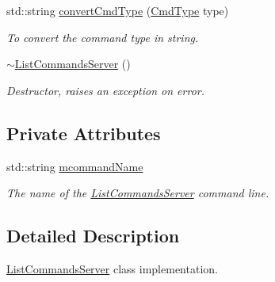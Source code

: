 \begin{DoxyCompactItemize}
std::string \hyperlink{classListCommandsServer_af253d25c235222b5872c31e590869a7a}{convertCmdType} (\hyperlink{CommandServer_8hpp_a7ae3a49efad67c34030ecbed1d947844}{CmdType} type)
\begin{DoxyCompactList}\small\item\em To convert the command type in string. \item\end{DoxyCompactList}\item 
\hypertarget{classListCommandsServer_afad26228bcf19880e8280e2bf5a54cad}{
\hyperlink{classListCommandsServer_afad26228bcf19880e8280e2bf5a54cad}{$\sim$ListCommandsServer} ()}
\label{classListCommandsServer_afad26228bcf19880e8280e2bf5a54cad}

\begin{DoxyCompactList}\small\item\em Destructor, raises an exception on error. \item\end{DoxyCompactList}\end{DoxyCompactItemize}
\subsection*{Private Attributes}
\begin{DoxyCompactItemize}
\item 
\hypertarget{classListCommandsServer_a4587e9f6bf59c8fe3bc0b9635e8880fd}{
std::string \hyperlink{classListCommandsServer_a4587e9f6bf59c8fe3bc0b9635e8880fd}{mcommandName}}
\label{classListCommandsServer_a4587e9f6bf59c8fe3bc0b9635e8880fd}

\begin{DoxyCompactList}\small\item\em The name of the \hyperlink{classListCommandsServer}{ListCommandsServer} command line. \item\end{DoxyCompactList}\end{DoxyCompactItemize}


\subsection{Detailed Description}
\hyperlink{classListCommandsServer}{ListCommandsServer} class implementation. 

